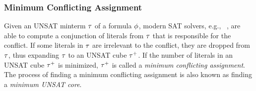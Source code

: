 \subsubsection{Minimum Conflicting Assignment}
Given an UNSAT minterm $\tau$ of a formula $\phi$,
modern SAT solvers, e.g., \minisat~\cite{Een2003Solver,Een2003Incremental},
are able to compute a conjunction of literals from $\tau$ that is responsible for the conflict.
If some literals in $\tau$ are irrelevant to the conflict,
they are dropped from $\tau$,
thus expanding $\tau$ to an UNSAT cube $\tau^+$.
If the number of literals in an UNSAT cube $\tau^+$ is minimized,
$\tau^+$ is called a \textit{minimum conflicting assignment}.
The process of finding a minimum conflicting assignment is also known as finding a \textit{minimum UNSAT core}.